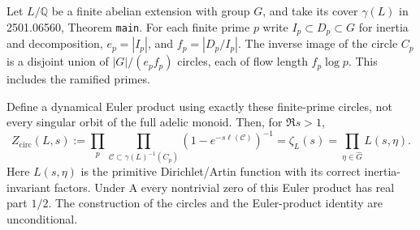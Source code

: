 \begin{proposition}
\label{AC-G15}
Let $L/\mathbb Q$ be a finite abelian extension with group $G$, and
take its cover $\gamma(L)$ in 2501.06560, Theorem \texttt{main}.
For each finite prime $p$ write $I_p\subset D_p\subset G$ for inertia
and decomposition, $e_p=|I_p|$, and
$f_p=|D_p/I_p|$.  The inverse image of the circle $C_p$ is a disjoint
union of $|G|/(e_pf_p)$ circles, each of flow length $f_p\log p$.
This includes the ramified primes.

Define a dynamical Euler product using exactly these finite-prime
circles, not every singular orbit of the full adelic monoid.  Then,
for $\Re s>1$,
\[
 Z_{\mathrm{circ}}(L,s)
 :=\prod_{p}\prod_{\mathcal C\subset\gamma(L)^{-1}(C_p)}
       (1-e^{-s\ell(\mathcal C)})^{-1}
 =\zeta_L(s)=\prod_{\eta\in\widehat G}L(s,\eta).
\]
Here $L(s,\eta)$ is the primitive Dirichlet/Artin function with its
correct inertia-invariant factors.  Under A every nontrivial zero of
this Euler product has real part $1/2$.  The construction of the
circles and the Euler-product identity are unconditional.
\end{proposition}
